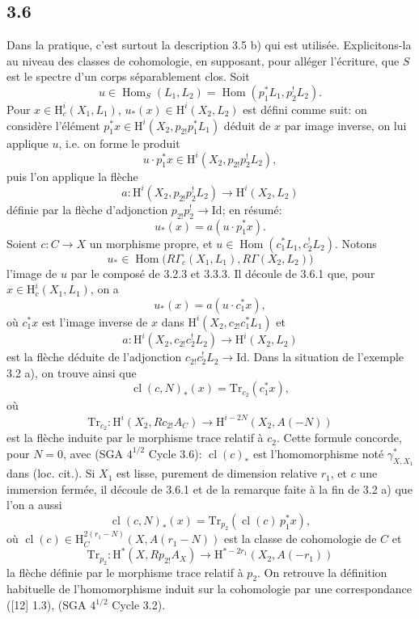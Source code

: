 \documentclass[11pt]{article}
\renewcommand{\H}{\mathrm{H}}
\DeclareMathOperator{\Hom}{Hom}
\providecommand{\Id}{\mathrm{Id}}
\providecommand{\Hom}{\operatorname{Hom}}
\providecommand{\Hom}{\operatorname{Hom}}
\begin{document}
\subsection*{3.6}
Dans la pratique, c'est surtout la description 3.5 b) qui est utilisée. Explicitons-la au niveau des classes de cohomologie, en supposant, pour alléger l'écriture, que $S$ est le spectre d'un corps séparablement clos. Soit
\[
u\in\Hom_S(L_1,L_2)=\Hom(p_1^*L_1,p_2^!L_2).
\]
Pour $x\in\H_c^i(X_1,L_1)$, $u_*(x)\in\H^i(X_2,L_2)$ est défini comme suit: on considère l'élément $p_1^*x\in\H^i(X_2,p_{2!}p_1^*L_1)$ déduit de $x$ par image inverse, on lui applique $u$, i.e. on forme le produit
\[
u\cdot p_1^*x\in \H^i(X_2,p_{2!}p_2^!L_2),
\]
puis l'on applique la flèche
\[
a:\H^i(X_2,p_{2!}p_2^!L_2)\longrightarrow \H^i(X_2,L_2)
\]
définie par la flèche d'adjonction $p_{2!}p_2^!\to\Id$; en résumé:
\begin{equation}
u_*(x)=a(u\cdot p_1^*x).
\tag{3.6.1}
\end{equation}
Soient $c:C\to X$ un morphisme propre, et $u\in\Hom(c_1^*L_1,c_2^!L_2)$. Notons
\[
u_*\in\Hom\bigl(R\Gamma_c(X_1,L_1),R\Gamma(X_2,L_2)\bigr)
\]
l'image de $u$ par le composé de 3.2.3 et 3.3.3. Il découle de 3.6.1 que, pour $x\in\H_c^i(X_1,L_1)$, on a
\begin{equation}
u_*(x)=a(u\cdot c_1^*x),
\tag{3.6.2}
\end{equation}
où $c_1^*x$ est l'image inverse de $x$ dans $\H^i(X_2,c_{2!}c_1^*L_1)$ et
\[
a:\H^i(X_2,c_{2!}c_2^!L_2)\longrightarrow \H^i(X_2,L_2)
\]
est la flèche déduite de l'adjonction $c_{2!}c_2^!L_2\to\Id$. Dans la situation de l'exemple 3.2 a), on trouve ainsi que
\begin{equation}
\operatorname{cl}(c,N)_*(x)=\mathrm{Tr}_{c_2}(c_1^*x),
\tag{3.6.3}
\end{equation}
où
\[
\mathrm{Tr}_{c_2}:\H^i(X_2,Rc_{2!}A_C)\longrightarrow\H^{i-2N}(X_2,A(-N))
\]
est la flèche induite par le morphisme trace relatif à $c_2$. Cette formule concorde, pour $N=0$, avec (SGA $4^{1/2}$ Cycle 3.6): $\operatorname{cl}(c)_*$ est l'homomorphisme noté $\gamma^*_{X,X_1}$ dans (loc. cit.). Si $X_1$ est lisse, purement de dimension relative $r_1$, et $c$ une immersion fermée, il découle de 3.6.1 et de la remarque faite à la fin de 3.2 a) que l'on a aussi
\begin{equation}
\operatorname{cl}(c,N)_*(x)=\mathrm{Tr}_{p_2}(\operatorname{cl}(c)\,p_1^*x),
\tag{3.6.4}
\end{equation}
où $\operatorname{cl}(c)\in \H_C^{2(r_1-N)}(X,A(r_1-N))$ est la classe de cohomologie de $C$ et
\[
\mathrm{Tr}_{p_2}:\H^*(X,Rp_{2!}A_X)\longrightarrow \H^{*-2r_1}(X_2,A(-r_1))
\]
la flèche définie par le morphisme trace relatif à $p_2$. On retrouve la définition habituelle de l'homomorphisme induit sur la cohomologie par une correspondance ([12] 1.3), (SGA $4^{1/2}$ Cycle 3.2).
\end{document}
